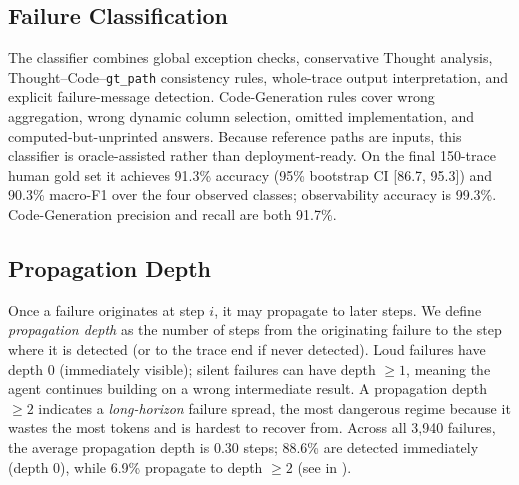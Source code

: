 \begin{table}[t]
\centering
\caption{Five-stage failure taxonomy (v2). Stages are defined by \emph{where the error is detectable}, making them mutually exclusive.}
\label{tab:taxonomy}
\small
{}
\end{table}

\subsection{Failure Classification}
\label{sec:classifier}

The classifier combines global exception checks, conservative Thought analysis, Thought--Code--\texttt{gt\_path} consistency rules, whole-trace output interpretation, and explicit failure-message detection. Code-Generation rules cover wrong aggregation, wrong dynamic column selection, omitted implementation, and computed-but-unprinted answers. Because reference paths are inputs, this classifier is oracle-assisted rather than deployment-ready. On the final 150-trace human gold set it achieves 91.3\% accuracy (95\% bootstrap CI [86.7, 95.3]) and 90.3\% macro-F1 over the four observed classes; observability accuracy is 99.3\%. Code-Generation precision and recall are both 91.7\%.

\subsection{Propagation Depth}
\label{sec:propagation}

Once a failure originates at step $i$, it may propagate to later steps. We define \emph{propagation depth} as the number of steps from the originating failure to the step where it is detected (or to the trace end if never detected). Loud failures have depth 0 (immediately visible); silent failures can have depth $\geq 1$, meaning the agent continues building on a wrong intermediate result. A propagation depth $\geq 2$ indicates a \emph{long-horizon} failure spread, the most dangerous regime because it wastes the most tokens and is hardest to recover from. Across all 3{,}940 failures, the average propagation depth is 0.30 steps; 88.6\% are detected immediately (depth 0), while 6.9\% propagate to depth $\geq 2$ (see  in ).

